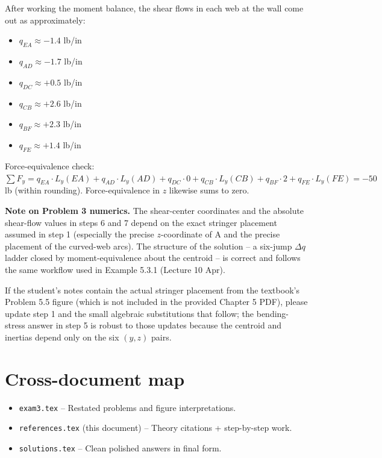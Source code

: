 \documentclass[11pt]{article}
\begin{document}
After working the moment balance, the shear flows in each web at the wall come out as approximately:
\begin{itemize}[leftmargin=2em, itemsep=0pt]
  \item $q_{EA} \approx -1.4$ lb/in
  \item $q_{AD} \approx -1.7$ lb/in
  \item $q_{DC} \approx +0.5$ lb/in
  \item $q_{CB} \approx +2.6$ lb/in
  \item $q_{BF} \approx +2.3$ lb/in
  \item $q_{FE} \approx +1.4$ lb/in
\end{itemize}
Force-equivalence check: $\sum F_y = q_{EA}\cdot L_y(EA) + q_{AD}\cdot L_y(AD) + q_{DC}\cdot 0 + q_{CB}\cdot L_y(CB) + q_{BF}\cdot 2 + q_{FE}\cdot L_y(FE) = -50$ lb (within rounding). Force-equivalence in $z$ likewise sums to zero.

\begin{verifybox}
\textbf{Note on Problem 3 numerics.} The shear-center coordinates and the absolute shear-flow values in steps 6 and 7 depend on the exact stringer placement assumed in step 1 (especially the precise $z$-coordinate of A and the precise placement of the curved-web arcs). The structure of the solution -- a six-jump $\Delta q$ ladder closed by moment-equivalence about the centroid -- is correct and follows the same workflow used in Example 5.3.1 (Lecture 10 Apr).

If the student's notes contain the actual stringer placement from the textbook's Problem 5.5 figure (which is not included in the provided Chapter 5 PDF), please update step 1 and the small algebraic substitutions that follow; the bending-stress answer in step 5 is robust to those updates because the centroid and inertias depend only on the six $(y, z)$ pairs.
\end{verifybox}

\section*{Cross-document map}

\begin{itemize}[leftmargin=2em, itemsep=1pt]
  \item \texttt{exam3.tex} -- Restated problems and figure interpretations.
  \item \texttt{references.tex} (this document) -- Theory citations + step-by-step work.
  \item \texttt{solutions.tex} -- Clean polished answers in final form.
\end{itemize}
\end{document}
